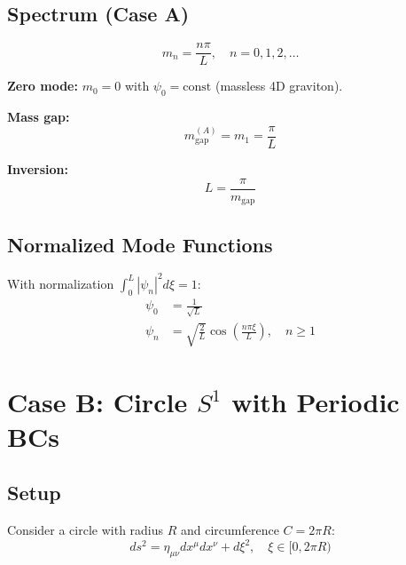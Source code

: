 \documentclass[11pt,a4paper]{article}
\newcommand{\mgap}{m_{\mathrm{gap}}}
\begin{document}
\subsection{Spectrum (Case A)}

\begin{equation}
\boxed{m_n = \frac{n\pi}{L}, \quad n = 0, 1, 2, \ldots}
\label{eq:spectrum-A}
\end{equation}

\textbf{Zero mode:} $m_0 = 0$ with $\psi_0 = \mathrm{const}$ (massless 4D graviton).

\textbf{Mass gap:}
\begin{equation}
\mgap^{(A)} = m_1 = \frac{\pi}{L}
\label{eq:mgap-A}
\end{equation}

\textbf{Inversion:}
\begin{equation}
\boxed{L = \frac{\pi}{\mgap}}
\label{eq:L-from-mgap}
\end{equation}

\subsection{Normalized Mode Functions}

With normalization $\int_0^L |\psi_n|^2 d\xi = 1$:
\begin{align}
\psi_0 &= \frac{1}{\sqrt{L}} \label{eq:caseA-psi0}\\
\psi_n &= \sqrt{\frac{2}{L}} \cos\left(\frac{n\pi\xi}{L}\right), \quad n \geq 1
\label{eq:caseA-psin}
\end{align}

\section{Case B: Circle $S^1$ with Periodic BCs}

\subsection{Setup}

Consider a circle with radius $R$ and circumference $C = 2\pi R$:
\begin{equation}
ds^2 = \eta_{\mu\nu} dx^\mu dx^\nu + d\xi^2, \quad \xi \in [0, 2\pi R)
\label{eq:caseB-metric}
\end{equation}
\end{document}
